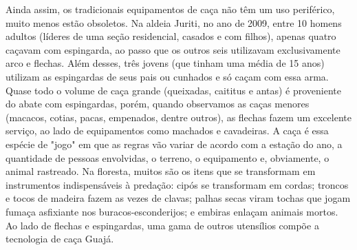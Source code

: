 Ainda assim, os tradicionais equipamentos de caça não têm um uso
periférico, muito menos estão obsoletos. Na aldeia Juriti, no ano de
2009, entre 10 homens adultos (líderes de uma seção residencial, casados
e com filhos), apenas quatro caçavam com espingarda, ao passo que os
outros seis utilizavam exclusivamente arco e flechas. Além desses, três
jovens (que tinham uma média de 15 anos) utilizam as espingardas de seus
pais ou cunhados e só caçam com essa arma. Quase todo o volume de caça
grande (queixadas, caititus e antas) é proveniente do abate com
espingardas, porém, quando observamos as caças menores (macacos, cotias,
pacas, empenados, dentre outros), as flechas fazem um excelente serviço,
ao lado de equipamentos como machados e cavadeiras. A caça é essa
espécie de "jogo" em que as regras vão variar de acordo com a estação do
ano, a quantidade de pessoas envolvidas, o terreno, o equipamento e,
obviamente, o animal rastreado. Na floresta, muitos são os itens que se
transformam em instrumentos indispensáveis à predação: cipós se
transformam em cordas; troncos e tocos de madeira fazem as vezes de
clavas; palhas secas viram tochas que jogam fumaça asfixiante nos
buracos-esconderijos; e embiras enlaçam animais mortos. Ao lado de
flechas e espingardas, uma gama de outros utensílios compõe a tecnologia
de caça Guajá.

